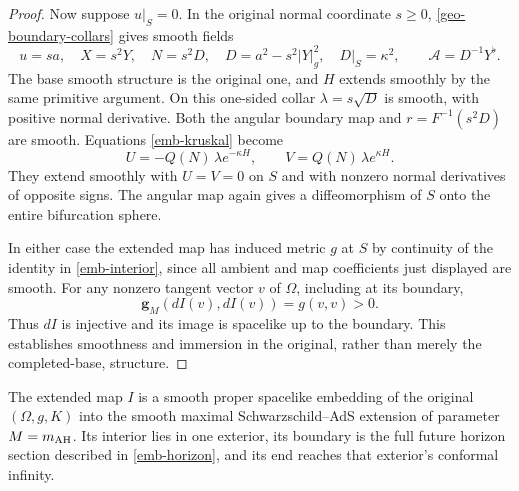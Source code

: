 \begin{proof}
Now suppose $u|_S=0$.  In the original normal coordinate $s\geq0$,
\cref{geo-boundary-collars} gives smooth fields
\[
 u=sa,\quad X=s^2Y,\quad
 N=s^2D,\quad D=a^2-s^2|Y|_g^2,\quad D|_S=\kappa^2,
 \qquad \mathcal A=D^{-1}Y^\flat .
\]
The base smooth structure is the original one, and $H$ extends
smoothly by the same primitive argument.  On this one-sided collar
$\lambda=s\sqrt D$ is smooth, with positive normal derivative.
Both the angular boundary map and $r=F^{-1}(s^2D)$ are smooth.
Equations \eqref{emb-kruskal} become
\begin{equation}
 U=-Q(N)\,\lambda e^{-\kappa H},\qquad
 V=Q(N)\,\lambda e^{\kappa H}.
 \label{emb-zero-kruskal}
\end{equation}
They extend smoothly with $U=V=0$ on $S$ and with nonzero
normal derivatives of opposite signs.  The angular map again gives
a diffeomorphism of $S$ onto the entire bifurcation sphere.

In either case the extended map has induced metric $g$ at $S$
by continuity of the identity in \cref{emb-interior}, since all
ambient and map coefficients just displayed are smooth.  For any
nonzero tangent vector $v$ of $\Omega$, including at its boundary,
\[
 \mathbf g_M(dI(v),dI(v))=g(v,v)>0.
\]
Thus $dI$ is injective and its image is spacelike up to the boundary.
This establishes smoothness and immersion in the original, rather
than merely the completed-base, structure.
\end{proof}

\begin{proposition}
\label{emb-global}
The extended map $I$ is a smooth proper spacelike embedding of the
original $(\Omega,g,K)$ into the smooth maximal Schwarzschild--AdS
extension of parameter $M=m_{\mathrm{AH}}$.  Its interior lies in one
exterior, its boundary is the full future horizon section described
in \cref{emb-horizon}, and its end reaches that exterior's conformal
infinity.
\end{proposition}

